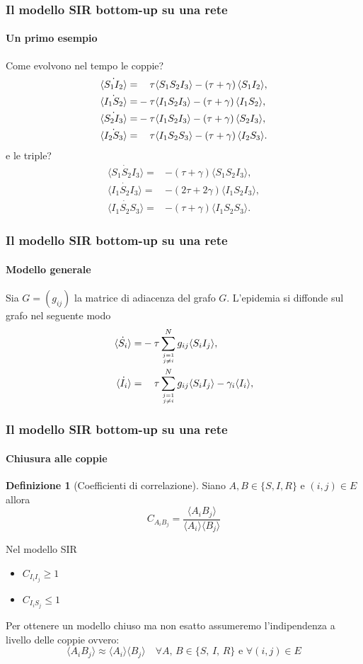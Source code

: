 \documentclass{beamer}
\newcommand{\spa}{\mathbin{\textcolor{white}{-}}}
\newcommand{\angol}[1]{\langle #1 \rangle}
\newcommand{\tonde}[1]{\left( #1 \right)}
\theoremstyle{definition}
\newtheorem{defn}{Definizione}
\theoremstyle{plain}
\begin{document}
\begin{frame}
\frametitle{Il modello SIR bottom-up su una rete}
\framesubtitle{Un primo esempio}
Come evolvono nel tempo le coppie?
    \begin{equation*}
\begin{aligned}
	\dot{\angol{S_1I_2}}=&\spa\tau\angol{S_1S_2I_3} - \tonde{ \tau + \gamma}\angol{S_1 I_2},
\\
	\dot{\angol{I_1S_2}}=&-\tau\angol{I_1S_2I_3} - \tonde{ \tau + \gamma}\angol{I_1 S_2},
\\
	\dot{\angol{S_2I_3}}=&-\tau\angol{I_1S_2I_3} - \tonde{ \tau + \gamma}\angol{S_2 I_3},
\\
	\dot{\angol{I_2S_3}}=&\spa\tau\angol{I_1S_2S_3} - \tonde{ \tau + \gamma}\angol{I_2 S_3}.
	\end{aligned}
\end{equation*}
\pause
e le triple?
\begin{equation*}
    \begin{aligned}
        	\dot{\angol{S_1S_2I_3}}=&-\tonde{\tau + \gamma}\angol{S_1S_2I_3},
\\
	\dot{\angol{I_1S_2I_3}}=&-\tonde{2\tau + 2\gamma}\angol{I_1S_2I_3},
\\
	\dot{\angol{I_1S_2S_3}}=&-\tonde{\tau + \gamma}\angol{I_1S_2S_3}.
 \end{aligned}
\end{equation*}
\end{frame}
\begin{frame}
      \frametitle{Il modello SIR bottom-up su una rete}
\framesubtitle{Modello generale}
Sia $G = \left( g_{ij}\right)$ la \alert{ matrice di adiacenza} del grafo $G$. L'epidemia si diffonde sul grafo nel seguente modo 
\begin{equation*}
\begin{aligned}
	 \dot{\angol{ S_i}}=& - \tau \sum_{j=1\atop{j\neq i }}^N g_{ij} \angol{ S_i I_j},\\
	 \dot{\angol{I_i}} =&\spa \tau \sum_{j=1\atop{j\neq i}}^N  g_{ij} \angol{ S_i I_j} -\gamma_i \angol{I_i},
\end{aligned}
\end{equation*}
\end{frame}
\begin{frame}
\frametitle{Il modello SIR bottom-up su una rete}
\framesubtitle{Chiusura alle coppie}
\begin{defn}[Coefficienti di correlazione]
Siano $A,B \in \{ S, I, R\}$ e $(i,j)\in E $ allora 
$$ C_{A_i B_j} = \frac{ \angol{ A_i B_j}}{\angol{A_i} \angol{B_j}} $$ 
\end{defn}
\pause
Nel modello SIR 
\begin{itemize}
\item $C_{I_i I_j} \geq 1 $ 
\item $C_{I_iS_j}\leq 1 $ 
\end{itemize}
\pause
Per ottenere un modello chiuso ma \alert{non esatto} assumeremo l'indipendenza a livello delle coppie ovvero:
$$ \angol{ A_i B_j } \approx \angol{ A_i }\angol{B_j} \quad \forall A, \, B \in \{ S, \, I,\, R\} \text{ e } \forall (i,j) \in E $$

\end{frame}
\end{document}
